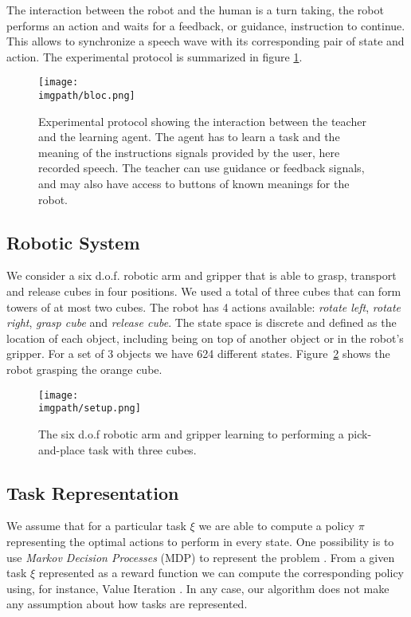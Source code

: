 The interaction between the robot and the human is a turn taking, the robot performs an action and waits for a feedback, or guidance, instruction to continue. This allows to synchronize a speech wave with its corresponding pair of state and action. The experimental protocol is summarized in figure \ref{fig:lfui:bloc}.

\begin{figure}[!htbp]
  \centering
  \texttt{[image: \\imgpath/bloc.png]}
  \caption{Experimental protocol showing the interaction between the teacher and the learning agent. The agent has to learn a task and the meaning of the instructions signals provided by the user, here recorded speech. The teacher can use guidance or feedback signals, and may also have access to buttons of known meanings for the robot.}
  \label{fig:lfui:bloc}    
\end{figure}

\subsection{Robotic System}

We consider a six d.o.f. robotic arm and gripper that is able to grasp, transport and release cubes in four positions. We used a total of three cubes that can form towers of at most two cubes.  The robot has 4 actions available: \textit{rotate left}, \textit{rotate right}, \textit{grasp cube} and \textit{release cube}. The state space is discrete and defined as the location of each object, including being on top of another object or in the robot's gripper. For a set of 3 objects we have 624 different states. Figure~\ref{fig:lfui:setup} shows the robot grasping the orange cube. 

\begin{figure}[!htbp]
  \centering
  \texttt{[image: \\imgpath/setup.png]}
  \caption{The six d.o.f robotic arm and gripper learning to performing a pick-and-place task with three cubes.}
  \label{fig:lfui:setup}
\end{figure}

\subsection{Task Representation}

We assume that for a particular task $\xi$ we are able to compute a policy $\pi$ representing the optimal actions to perform in every state. One possibility is to use \textit{Markov Decision Processes} (MDP) to represent the problem \cite{sutton1998reinforcement}. From a given task $\xi$ represented as a reward function we can compute the corresponding policy using, for instance, Value Iteration \cite{sutton1998reinforcement}. In any case, our algorithm does not make any assumption about how tasks are represented.

